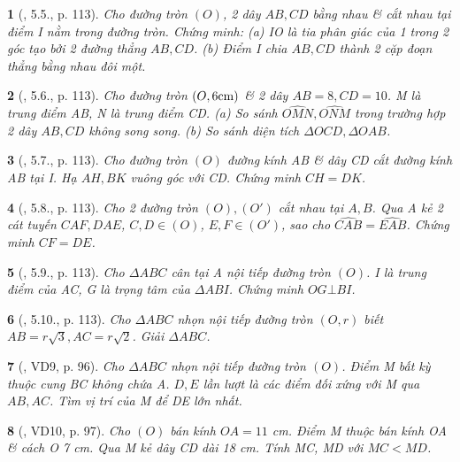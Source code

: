 \documentclass{article}
\newtheorem{baitoan}{}
\begin{document}
\begin{baitoan}[\cite{Binh_boi_duong_Toan_9_tap_1}, 5.5., p. 113]
	Cho đường tròn $(O)$, 2 dây $AB,CD$ bằng nhau \& cắt nhau tại điểm I nằm trong đường tròn. Chứng minh: (a) IO là tia phân giác của 1 trong 2 góc tạo bởi 2 đường thẳng $AB,CD$. (b) Điểm I chia $AB,CD$ thành 2 cặp đoạn thẳng bằng nhau đôi một.
\end{baitoan}

\begin{baitoan}[\cite{Binh_boi_duong_Toan_9_tap_1}, 5.6., p. 113]
	Cho đường tròn $(O,6{\rm cm})$ \& 2 dây $AB = 8,CD = 10$. M là trung điểm AB, N là trung điểm CD. (a) So sánh $\widehat{OMN},\widehat{ONM}$ trong trường hợp 2 dây $AB,CD$ không song song. (b) So sánh diện tích $\Delta OCD,\Delta OAB$.
\end{baitoan}

\begin{baitoan}[\cite{Binh_boi_duong_Toan_9_tap_1}, 5.7., p. 113]
	Cho đường tròn $(O)$ đường kính AB \& dây CD cắt đường kính AB tại I. Hạ $AH,BK$ vuông góc với CD. Chứng minh $CH = DK$.
\end{baitoan}

\begin{baitoan}[\cite{Binh_boi_duong_Toan_9_tap_1}, 5.8., p. 113]
	Cho 2 đường tròn $(O),(O')$ cắt nhau tại $A,B$. Qua A kẻ 2 cát tuyến $CAF,DAE$, $C,D\in(O)$, $E,F\in(O')$, sao cho $\widehat{CAB} = \widehat{EAB}$. Chứng minh $CF = DE$.
\end{baitoan}

\begin{baitoan}[\cite{Binh_boi_duong_Toan_9_tap_1}, 5.9., p. 113]
	Cho $\Delta ABC$ cân tại A nội tiếp đường  tròn $(O)$. I là trung điểm của AC, G là trọng tâm của $\Delta ABI$. Chứng minh $OG\bot BI$.
\end{baitoan}

\begin{baitoan}[\cite{Binh_boi_duong_Toan_9_tap_1}, 5.10., p. 113]
	Cho $\Delta ABC$ nhọn nội tiếp đường tròn $(O,r)$ biết $AB = r\sqrt{3},AC = r\sqrt{2}$. Giải $\Delta ABC$.
\end{baitoan}

\begin{baitoan}[\cite{Binh_Toan_9_tap_1}, VD9, p. 96]
	Cho $\Delta ABC$ nhọn nội tiếp đường tròn $(O)$. Điểm M bất kỳ thuộc cung BC không chứa A. $D,E$ lần lượt là các điểm đối xứng với M qua $AB,AC$. Tìm vị trí của M để DE lớn nhất.
\end{baitoan}

\begin{baitoan}[\cite{Binh_Toan_9_tap_1}, VD10, p. 97]
	Cho $(O)$ bán kính $OA = 11$ {\rm cm}. Điểm M thuộc bán kính OA \& cách O {\rm7 cm}. Qua M kẻ dây CD dài {\rm18 cm}. Tính MC, MD với $MC < MD$.
\end{baitoan}
\end{document}
